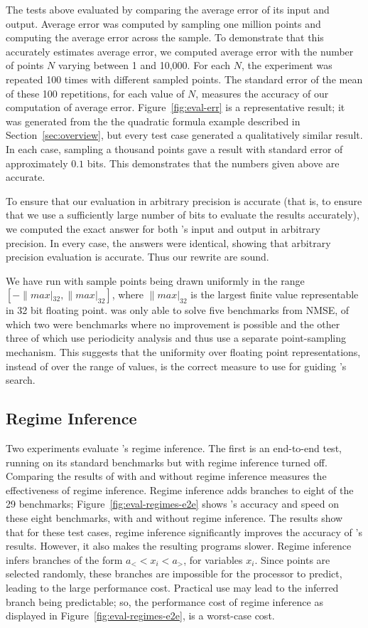 \documentclass[paper.tex]{subfiles}
\begin{document}
The tests above evaluated \casio by comparing the average error of its
input and output.  Average error was computed by sampling one million
points and computing the average error across the sample.  To
demonstrate that this accurately estimates average error, we computed
average error with the number of points $N$ varying between 1 and
10,000.  For each $N$, the experiment was repeated 100 times with
different sampled points.  The standard error of the mean of these 100
repetitions, for each value of $N$, measures the accuracy of our
computation of average error.  Figure~\ref{fig:eval-err} is a
representative result; it was generated from the the quadratic formula
example described in Section~\ref{sec:overview}, but every test case
generated a qualitatively similar result.  In each case, sampling a
thousand points gave a result with standard error of approximately
$0.1$ bits.  This demonstrates that the numbers given above are
accurate.

To ensure that our evaluation in arbitrary precision is accurate (that
is, to ensure that we use a sufficiently large number of bits to
evaluate the results accurately), we computed the exact answer for
both \casio's input and output in arbitrary precision.  In every case,
the answers were identical, showing that arbitrary precision
evaluation is accurate. Thus our rewrite are sound.

We have run \casio with sample points being drawn uniformly in the
range $[-\|max|_{32}, \|max|_{32}]$, where $\|max|_{32}$ is the
largest finite value representable in 32 bit floating point.  \casio
was only able to solve five benchmarks from NMSE, of which two were
benchmarks where no improvement is possible and the other three of
which use periodicity analysis and thus use a separate point-sampling
mechanism.  This suggests that the uniformity over floating point
representations, instead of over the range of values, is the correct
measure to use for guiding \casio's search.

\subsection{Regime Inference} \label{sec:eval-regimes}

Two experiments evaluate \casio's regime inference.  The first is an
end-to-end test, running \casio on its standard benchmarks but with
regime inference turned off.  Comparing the results of \casio with and
without regime inference measures the effectiveness of regime
inference.  Regime inference adds branches to eight of the 29
benchmarks; Figure~\ref{fig:eval-regimes-e2e} shows \casio's accuracy
and speed on these eight benchmarks, with and without regime
inference.  The results show that for these test cases, regime
inference significantly improves the accuracy of \casio's results.
However, it also makes the resulting programs slower.  Regime
inference infers branches of the form $a_< < x_i < a_>$, for variables
$x_i$.  Since points are selected randomly, these branches are
impossible for the processor to predict, leading to the large
performance cost.  Practical use may lead to the inferred branch being
predictable; so, the performance cost of regime inference as displayed
in Figure~\ref{fig:eval-regimes-e2e}, is a worst-case cost.
\end{document}

